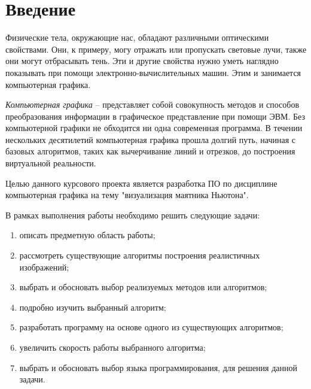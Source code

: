 \newpage
\chapter*{Введение}

Физические тела, окружающие нас, обладают различными оптическими свойствами. Они, к примеру, могу отражать или пропускать световые лучи,
также они могут отбрасывать тень. Эти и другие свойства нужно уметь наглядно показывать при помощи электронно-вычислительных машин.
Этим и занимается компьютерная графика.

\textit{Компьютерная графика} -- представляет собой совокупность методов и способов преобразования информации в графическое представление при помощи ЭВМ.
Без компьютерной графики не обходится ни одна современная программа. В течении нескольких десятилетий компьютерная графика прошла долгий путь, начиная с базовых
алгоритмов, таких как вычерчивание линий и отрезков, до построения виртуальной реальности.

Целью данного курсового проекта является разработка ПО по дисциплине компьютерная графика на тему "визуализация маятника Ньютона".

В рамках выполнения работы необходимо решить следующие задачи:

\begin{enumerate}
	\item описать предметную область работы;
	\item рассмотреть существующие алгоритмы построения реалистичных изображений;
	\item выбрать и обосновать выбор реализуемых методов или алгоритмов;
	\item подробно изучить выбранный алгоритм;
	\item разработать программу на основе одного из существующих алгоритмов;
	\item увеличить скорость работы выбранного алгоритма;
	\item выбрать и обосновать выбор языка программирования, для решения данной задачи.
\end{enumerate}
